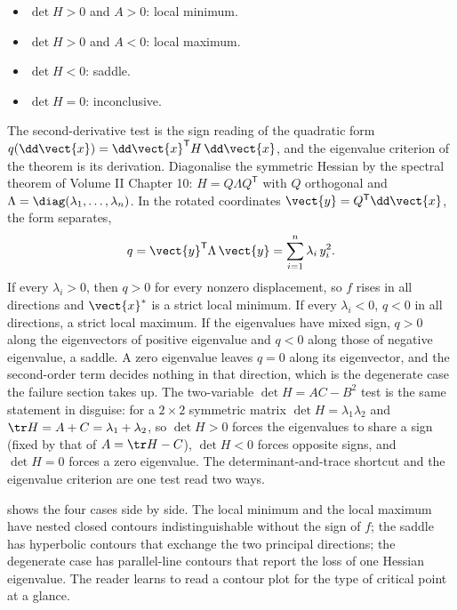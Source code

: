 \begin{itemize}[leftmargin=*]
  \item $\det H > 0$ and $A > 0$: local minimum.
  \item $\det H > 0$ and $A < 0$: local maximum.
  \item $\det H < 0$: saddle.
  \item $\det H = 0$: inconclusive.
\end{itemize}

\begin{mastery}
The second-derivative test is the sign reading of the quadratic
form $q(\dd\vect{x}) = \dd\vect{x}^{\mathsf{T}} H\,\dd\vect{x}$, and
the eigenvalue criterion of the theorem is its derivation. Diagonalise
the symmetric Hessian by the spectral theorem of Volume II
Chapter 10: $H = Q\Lambda Q^{\mathsf{T}}$ with $Q$ orthogonal and
$\Lambda = \diag(\lambda_{1}, \ldots, \lambda_{n})$. In the rotated
coordinates $\vect{y} = Q^{\mathsf{T}}\dd\vect{x}$, the form
separates,
\[
q = \vect{y}^{\mathsf{T}}\Lambda\,\vect{y} =
\sum_{i = 1}^{n}\lambda_{i}\,y_{i}^{2}.
\]
If every $\lambda_{i} > 0$, then $q > 0$ for every nonzero
displacement, so $f$ rises in all directions and $\vect{x}^{*}$ is a
strict local minimum. If every $\lambda_{i} < 0$, $q < 0$ in all
directions, a strict local maximum. If the eigenvalues have mixed
sign, $q > 0$ along the eigenvectors of positive eigenvalue and
$q < 0$ along those of negative eigenvalue, a saddle. A zero
eigenvalue leaves $q = 0$ along its eigenvector, and the
second-order term decides nothing in that direction, which is the
degenerate case the failure section takes up. The two-variable
$\det H = AC - B^{2}$ test is the same statement in disguise: for a
$2\times 2$ symmetric matrix $\det H = \lambda_{1}\lambda_{2}$ and
$\tr H = A + C = \lambda_{1} + \lambda_{2}$, so $\det H > 0$ forces
the eigenvalues to share a sign (fixed by that of $A = \tr H -
C$), $\det H < 0$ forces opposite signs, and $\det H = 0$ forces a
zero eigenvalue. The determinant-and-trace shortcut and the
eigenvalue criterion are one test read two ways.
\end{mastery}

 shows the four cases
side by side. The local minimum and the local maximum have nested
closed contours indistinguishable without the sign of $f$; the
saddle has hyperbolic contours that exchange the two principal
directions; the degenerate case has parallel-line contours that
report the loss of one Hessian eigenvalue. The reader learns to
read a contour plot for the type of critical point at a glance.

